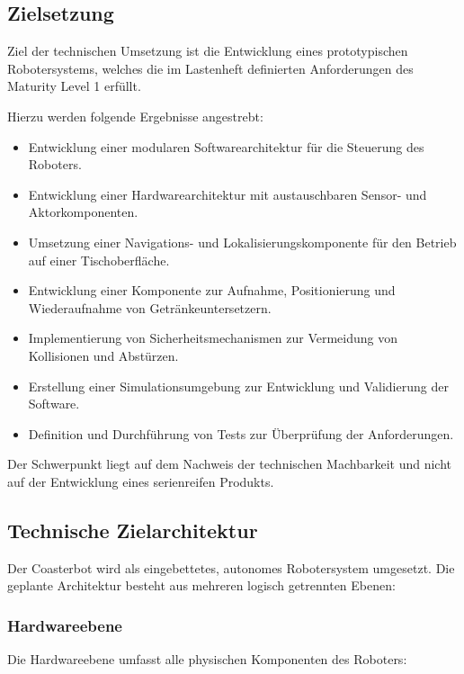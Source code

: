 \subsection{Zielsetzung}\label{zielsetzung}

Ziel der technischen Umsetzung ist die Entwicklung eines prototypischen
Robotersystems, welches die im Lastenheft definierten Anforderungen des
Maturity Level 1 erfüllt.

Hierzu werden folgende Ergebnisse angestrebt:

\begin{itemize}
\tightlist
\item
  Entwicklung einer modularen Softwarearchitektur für die Steuerung des
  Roboters.
\item
  Entwicklung einer Hardwarearchitektur mit austauschbaren Sensor- und
  Aktorkomponenten.
\item
  Umsetzung einer Navigations- und Lokalisierungskomponente für den
  Betrieb auf einer Tischoberfläche.
\item
  Entwicklung einer Komponente zur Aufnahme, Positionierung und
  Wiederaufnahme von Getränkeuntersetzern.
\item
  Implementierung von Sicherheitsmechanismen zur Vermeidung von
  Kollisionen und Abstürzen.
\item
  Erstellung einer Simulationsumgebung zur Entwicklung und Validierung
  der Software.
\item
  Definition und Durchführung von Tests zur Überprüfung der
  Anforderungen.
\end{itemize}

Der Schwerpunkt liegt auf dem Nachweis der technischen Machbarkeit und
nicht auf der Entwicklung eines serienreifen Produkts.

\subsection{Technische
Zielarchitektur}\label{technische-zielarchitektur}

Der Coasterbot wird als eingebettetes, autonomes Robotersystem
umgesetzt. Die geplante Architektur besteht aus mehreren logisch
getrennten Ebenen:

\subsubsection{Hardwareebene}\label{hardwareebene}

Die Hardwareebene umfasst alle physischen Komponenten des Roboters:

